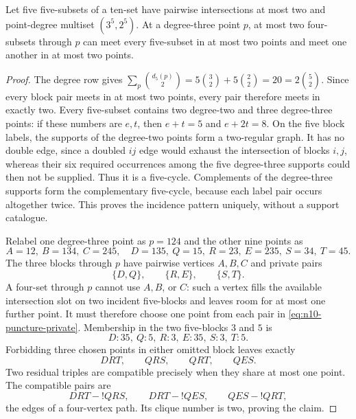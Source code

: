 \begin{lemma}\label{lem:n10-punctured-pentagon}
Let five five-subsets of a ten-set have pairwise intersections at most two
and point-degree multiset $(3^5,2^5)$.  At a degree-three point $p$, at most
two four-subsets through $p$ can meet every five-subset in at most two
points and meet one another in at most two points.
\end{lemma}

\begin{proof}
The degree row gives
$\sum_p\binom{d_5(p)}2=5\binom32+5\binom22=20
=2\binom52$.  Since every block pair meets in at most two points, every
pair therefore meets in exactly two.
Every five-subset contains two degree-two and three degree-three points:
if these numbers are $e,t$, then $e+t=5$ and $e+2t=8$.  On the five block
labels, the supports of the degree-two points form a two-regular graph.
It has no double edge, since a doubled $ij$ edge would exhaust the
intersection of blocks $i,j$, whereas their six required occurrences among
the five degree-three supports could then not be supplied.  Thus it is a
five-cycle.  Complements of the degree-three supports form the complementary
five-cycle, because each label pair occurs altogether twice.  This proves
the incidence pattern uniquely, without a support catalogue.

Relabel one degree-three point as $p=124$ and the other nine points as
\[
 A=12,\ B=134,\ C=245,\quad
 D=135,\ Q=15,\ R=23,\ E=235,\ S=34,\ T=45.
\]
The three blocks through $p$ have pairwise vertices $A,B,C$ and private
pairs
\begin{equation}\label{eq:n10-puncture-private}
 \{D,Q\},\qquad\{R,E\},\qquad\{S,T\}.
\end{equation}
A four-set through $p$ cannot use $A,B$, or $C$: such a vertex fills the
available intersection slot on two incident five-blocks and leaves room
for at most one further point.  It must therefore choose one point from
each pair in \eqref{eq:n10-puncture-private}.  Membership in the two
five-blocks $3$ and $5$ is
\[
 D:35,\ Q:5,\ R:3,\ E:35,\ S:3,\ T:5.
\]
Forbidding three chosen points in either omitted block leaves exactly
\begin{equation}\label{eq:n10-puncture-four}
 DRT,\qquad QRS,\qquad QRT,\qquad QES.
\end{equation}
Two residual triples are compatible precisely when they share at most one
point.  The compatible pairs are
\[
 DRT\!-!QRS,\qquad DRT\!-!QES,\qquad QES\!-!QRT,
\]
the edges of a four-vertex path.  Its clique number is two, proving the
claim.
\end{proof}

